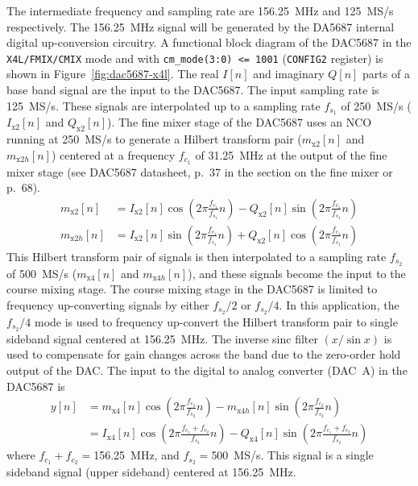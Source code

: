 \documentclass[12pt,letterpaper]{article}
\begin{document}
The intermediate frequency and sampling rate are 156.25~MHz and
125~MS/s respectively. The 156.25~MHz signal will be generated by the
DA5687 internal digital up-conversion circuitry. A functional block
diagram of the DAC5687 in the \texttt{X4L/FMIX/CMIX} mode and with
\texttt{cm\_mode(3:0) <= 1001} (\texttt{CONFIG2} register) is shown in
Figure~\ref{fig:dac5687-x4l}. The real $I[n]$ and imaginary $Q[n]$
parts of a base band signal are the input to the DAC5687. The input
sampling rate is 125~MS/s. These signals are interpolated up to a
sampling rate $f_{s_1}$ of 250~MS/s ($I_\text{x2}[n]$ and
$Q_\text{x2}[n]$). The fine mixer stage of the DAC5687 uses an NCO
running at 250~MS/s to generate a Hilbert transform pair
($m_\text{x2}[n]$ and $m_{\text{x2}h}[n]$) centered at a frequency
$f_{c_1}$ of 31.25~MHz at the output of the fine mixer stage (see
DAC5687 datasheet, p.~37 in the section on the fine mixer or p.~68).
\begin{equation}
  \begin{aligned}
    m_\text{x2}[n] &= I_\text{x2}[n]\cos\left(2\pi\frac{f_{c_1}}{f_{s_1}}n\right)-Q_\text{x2}[n]\sin\left(2\pi\frac{f_{c_1}}{f_{s_1}}n\right) \\
    m_{\text{x2}h}[n] &= I_\text{x2}[n]\sin\left(2\pi\frac{f_{c_1}}{f_{s_1}}n\right)+Q_\text{x2}[n]\cos\left(2\pi\frac{f_{c_1}}{f_{s_1}}n\right)
  \end{aligned}
\end{equation}
This Hilbert transform pair of signals is then interpolated to a
sampling rate $f_{s_2}$ of 500~MS/s ($m_\text{x4}[n]$ and
$m_{\text{x4}h}[n]$), and these signals become the input to the course
mixing stage. The course mixing stage in the DAC5687 is limited to
frequency up-converting signals by either $f_{s_2}/2$ or
$f_{s_2}/4$. In this application, the $f_{s_2}/4$ mode is used to
frequency up-convert the Hilbert transform pair to single sideband
signal centered at 156.25~MHz. The inverse sinc filter $(x/\sin x)$ is
used to compensate for gain changes across the band due to the
zero-order hold output of the DAC. The input to the digital to analog
converter (DAC~A) in the DAC5687 is
\begin{align}
  y[n] & = m_\text{x4}[n]\cos\left(2\pi\frac{f_{c_2}}{f_{s_2}}n\right)-m_{\text{x4}h}[n]\sin\left(2\pi\frac{f_{c_2}}{f_{s_2}}n\right) \label{eq:dac_input} \\
  & = I_\text{x4}[n]\cos\left(2\pi\frac{f_{c_1}+f_{c_2}}{f_{s_2}}n\right) - Q_\text{x4}[n]\sin\left(2\pi\frac{f_{c_1}+f_{c_2}}{f_{s_2}}n\right)
\end{align}
where $f_{c_1}+f_{c_2}=$156.25~MHz, and $f_{s_2}=$500~MS/s. This
signal is a single sideband signal (upper sideband) centered at
156.25~MHz.
\end{document}
